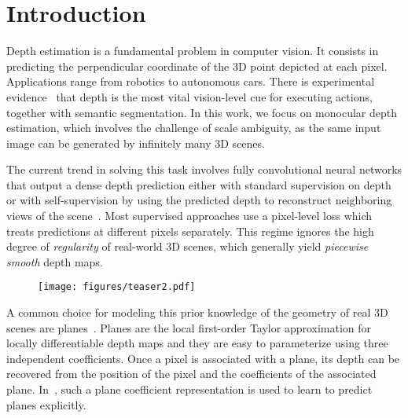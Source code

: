 \documentclass[final]{cvpr}
\begin{document}
\section{Introduction}
\label{sec:intro}

Depth estimation is a fundamental problem in computer vision. It consists in predicting the perpendicular coordinate of the 3D point depicted at each pixel.  Applications range from robotics to autonomous cars. There is experimental evidence~\cite{does:vision:matter:for:action} that depth is the most vital vision-level cue for executing actions, together with semantic segmentation. In this work, we focus on monocular depth estimation, which involves the challenge of scale ambiguity, as the same input image can be generated by infinitely many 3D scenes.

The current trend in solving this task involves fully convolutional neural networks that output a dense depth prediction either with standard supervision on depth~\cite{depth:multiscale:network,depth:frcn,deep:ordinal:regression:network,structure:guided:ranking:loss:depth} or with self-supervision by using the predicted depth to reconstruct neighboring views of the scene~\cite{unsupervised:cnn:single:view:depth,monodepth,unsupervised:depth:ego:motion:from:video,monodepth2}. Most supervised approaches use a pixel-level loss which treats predictions at different pixels separately. This regime ignores the high degree of \emph{regularity} of real-world 3D scenes, which generally yield \emph{piecewise smooth} depth maps.

\begin{figure}
    \centering
    \texttt{[image: figures/teaser2.pdf]}
    \label{fig:teaser}
    \vspace{-0.4cm}
\end{figure}

A common choice for modeling this prior knowledge of the geometry of real 3D scenes are planes~\cite{robust:piecewise:planar:3d:reconstruction,fast:approximate:piecewise:planar:modeling,planenet:piecewise:planar:reconstruction,planercnn:3d:plane:detection:reconstruction}. Planes are the local first-order Taylor approximation for locally differentiable depth maps and they are easy to parameterize using three independent coefficients. Once a pixel is associated with a plane, its depth can be recovered from the position of the pixel and the coefficients of the associated plane. In~\cite{geolayout}, such a plane coefficient representation is used to learn to predict planes explicitly.
\end{document}

